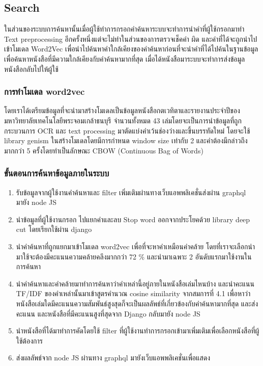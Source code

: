 \subsection{Search}

ในส่วนของระบบการค้นหานั้นเมื่อผู้ใช้ทำการกรอกคำค้นหาระบบจะทำการนำคำที่ผู้ใช้กรอกมาทำ Text preprocessing อีกครั้งหนึ่งแต่จะไม่ทำในส่วนของการตรวจเช็คคำ ผิด และคำที่ได้จะถูกนำไปเข้าโมเดล Word2Vec เพื่อนำไปค้นหาคำใกล้เคียงของคำค้นหาก่อนที่จะนำคำที่ได้ไปค้นในฐานข้อมูลเพื่อค้นหาหนังสือที่มีความใกล้เคียงกับคำค้นหามากที่สุด เมื่อได้หนังสือมาระบบจะทำการส่งข้อมูลหนังสือกลับไปให้ผู้ใช้

\subsubsection{การทำโมเดล word2vec}

โดยเราได้เตรียมข้อมูลที่จะนำมาสร้างโมเดลเป็นข้อมูลหนังสือกตเวทิตาและรายงานประจำปีของมหาวิทยาลัยเทคโนโลยีพระจอมเกล้าธนบุรี จำนวนทั้งหมด 43 เล่มโดยจะเป็นการนำข้อมูลที่ถูกกระบวนการ OCR และ text processing มาตัดแบ่งคำเว้นช่องว่างและขึ้นบรรทัดใหม่ โดยจะใช้ library genism ในสร้างโมเดลโดยมีการกำหนด window size เท่ากับ 2 และคำต้องมีกล่าวถึงมากกว่า 5 ครั้งโดยทำเป็นลักษณะ CBOW (Continuous Bag of Words)

\subsubsection{ขั้นตอนการค้นหาข้อมูลภายในระบบ}

\begin{enumerate}
    \item รับข้อมูลจากผู้ใช้งานคำค้นหาและ filter เพิ่มเติมผ่านทางเว็บแอพพลิเคชั่นส่งผ่าน graphql มายัง node JS
    \item นำข้อมูลที่ผู้ใช้งานกรอก ไปแยกคำและลบ Stop word ออกจากประโยคด้วย library deep cut โดยเรียกใช้ผ่าน django
    \item นำคำค้นหาที่ถูกแยกมาเข้าโมเดล word2vec เพื่อที่จะหาคำเหมือนคำคล้าย โดยที่เราจะเลือกนำมาใช้จะต้องมีคะแนนความคล้ายคลึงมากกว่า  72 \% และนำมาเฉพาะ 2 อันดับแรกมาใช้งานในการค้นหา
    \item นำคำค้นหาและคำคล้ายมาทำการค้นหาว่าคำเหล่านี้อยู่ภายในหนังสือเล่มไหนบ้าง และนำคะแนน TF/IDF ของคำเหล่านั้นมาเข้าสูตรคำนวณ cosine similarity จากสมการที่ 4.1 เพื่อหาว่าหนังสือเล่มใดมีคะแนนความสัมพันธ์สูงสุดก็จะเป็นผลลัพธ์ที่เกี่ยวข้องกับคำค้นหามากที่สุด และส่งคะแนน และหนังสือที่มีคะแนนสูงที่สุดจาก Django กลับมายัง node JS
    \item นำหนังสือที่ได้มาทำการคัดโดยใช้ filter ที่ผู้ใช้งานทำการกรอกเข้ามาเพิ่มเติมเพื่อเลือกหนังสือที่ผู้ใช้ต้องการ
    \item ส่งผลลัพธ์จาก node JS ผ่านทาง graphql มายังเว็บแอพพลิเคชั่นเพื่อแสดง
\end{enumerate}


